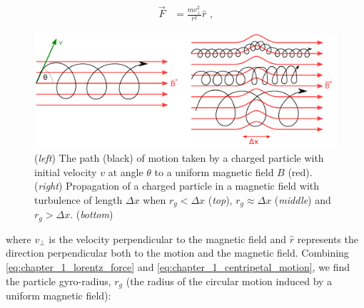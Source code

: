 \begin{equation}
    \begin{aligned}
    \vec{F}&=\frac{mv_\perp^2}{r^2}\hat{r}\text{ ,}
    \end{aligned} \label{eq:chapter_1_centripetal_motion}
\end{equation}
\begin{figure}[b!]
    \centering
    \includegraphics[width=1.0\textwidth]{04_Introduction/Images/cosmic_rays/combined_turbulence.pdf}
    \caption{ (\textit{left}) The path (black) of motion taken by a charged particle with initial velocity $v$ at angle $\theta$ to a uniform magnetic field $B$ (red). (\textit{right}) Propagation of a charged particle in a magnetic field  with turbulence of length $\Delta x$ when $r_g<\Delta x$ (\textit{top}), $r_g\approx \Delta x$ (\textit{middle}) and $r_g>\Delta x$. (\textit{bottom})}
    \label{fig:01_CR_in_Bfield}
\end{figure}

\noindent where $v_\perp$ is the velocity perpendicular to the magnetic field and $\hat{r}$ represents the direction perpendicular both to the motion and the magnetic field. Combining \autoref{eq:chapter_1_lorentz_force} and \autoref{eq:chapter_1_centripetal_motion}, we find the particle gyro-radius, $r_g$ (the radius of the circular motion induced by a uniform magnetic field):

